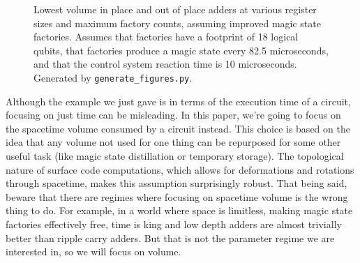 \documentclass[onecolumn,unpublished]{quantumarticle}
\theoremstyle{definition}
\theoremstyle{definition}
\theoremstyle{definition}
\begin{document}
\begin{figure}
    \centering
    \caption{
        Lowest volume in place and out of place adders at various register sizes and maximum factory counts, assuming improved magic state factories.
        Assumes that factories have a footprint of 18 logical qubits, that factories produce a magic state every 82.5 microseconds, and that the control system reaction time is 10 microseconds.
        Generated by \texttt{generate\_figures.py}.
    }
    \label{fig:minioh}
\end{figure}

Although the example we just gave is in terms of the execution time of a circuit, focusing on just time can be misleading.
In this paper, we're going to focus on the spacetime volume consumed by a circuit instead.
This choice is based on the idea that any volume not used for one thing can be repurposed for some other useful task (like magic state distillation or temporary storage).
The topological nature of surface code computations, which allows for deformations and rotations through spacetime, makes this assumption surprisingly robust.
That being said, beware that there are regimes where focusing on spacetime volume is the wrong thing to do.
For example, in a world where space is limitless, making magic state factories effectively free, time is king and low depth adders are almost trivially better than ripple carry adders.
But that is not the parameter regime we are interested in, so we will focus on volume.
\end{document}
